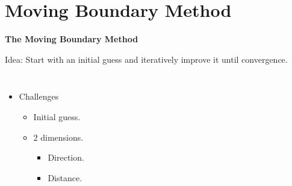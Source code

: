 \documentclass{beamer}
\begin{document}
\section{Moving Boundary Method}
\begin{frame}
{\bf The Moving Boundary Method}

Idea: Start with an initial guess and iteratively improve it until convergence.
\begin{columns}
\begin{itemize}
  \item Challenges
  \begin{itemize}
  \item Initial guess.
  \item 2 dimensions.
\begin{itemize}
  \item Direction.
  \item Distance.
\end{itemize}
  \end{itemize}
\end{itemize}
\end{columns}
\end{frame}
\end{document}
